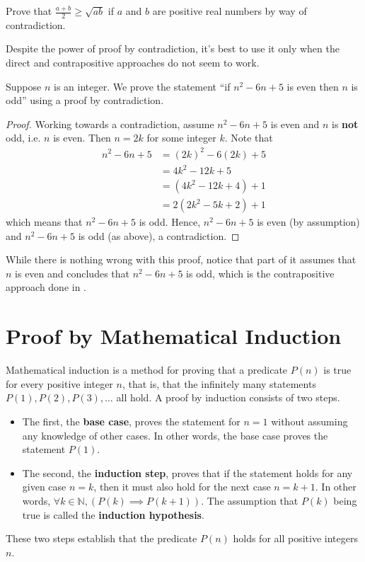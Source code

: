 \begin{exercise}
    Prove that $\frac{a+b}{2} \geq \sqrt{ab}$ if $a$ and $b$ are positive real numbers by way of contradiction.
\end{exercise}

Despite the power of proof by contradiction, it's best to use it only when the direct and contrapositive approaches do not seem to work.
\begin{example}
    Suppose $n$ is an integer. We prove the statement ``if $n^2 - 6n + 5$ is even then $n$ is odd'' using a proof by contradiction.
    \begin{proof}
        Working towards a contradiction, assume $n^2 - 6n + 5$ is even and $n$ is \textbf{not} odd, i.e. $n$ is even. Then $n = 2k$ for some integer $k$. Note that
        \begin{align*}
            n^2 - 6n + 5 &= (2k)^2 - 6(2k) + 5\\
            &= 4k^2 - 12k + 5\\
            &= (4k^2 - 12k + 4) + 1\\
            &= 2(2k^2 - 5k + 2) + 1
        \end{align*}
        which means that $n^2 - 6n + 5$ is odd. Hence, $n^2 - 6n + 5$ is even (by assumption) and $n^2 - 6n + 5$ is odd (as above), a contradiction.
    \end{proof}
    While there is nothing wrong with this proof, notice that part of it assumes that $n$ is even and concludes that  $n^2 - 6n + 5$ is odd, which is the contrapositive approach done in .
\end{example}

\section{Proof by Mathematical Induction}
Mathematical induction is a method for proving that a predicate $P(n)$ is true for every positive integer $n$, that is, that the infinitely many statements $P(1), P(2), P(3), \dots$ all hold. A proof by induction consists of two steps.
\begin{itemize}
    \item The first, the \textbf{base case}, proves the statement for $n = 1$ without assuming any knowledge of other cases. In other words, the base case proves the statement $P(1)$.
    \item The second, the \textbf{induction step}, proves that if the statement holds for any given case $n = k$, then it must also hold for the next case $n = k + 1$. In other words, $\forall k \in \mathbb{N}, (P(k) \implies P(k+1))$. The assumption that $P(k)$ being true is called the \textbf{induction hypothesis}.
\end{itemize}
These two steps establish that the predicate $P(n)$ holds for all positive integers $n$.

